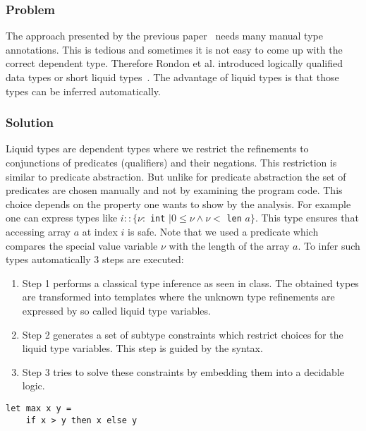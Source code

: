 \documentclass[a4paper,UKenglish]{lipics-v2016}
\begin{document}
\subsubsection{Problem}

The approach presented by the previous paper~\cite{Xi:1998:EAB} needs many manual type annotations.
This is tedious and sometimes it is not easy to come up with the correct dependent type.
Therefore Rondon et al. introduced logically qualified data types or short liquid types~\cite{Rondon:2008:LT}.
The advantage of liquid types is that those types can be inferred automatically.

\subsubsection{Solution}

Liquid types are dependent types where we restrict the refinements to conjunctions of predicates (qualifiers) and their negations.
This restriction is similar to predicate abstraction.
But unlike for predicate abstraction the set of predicates are chosen manually and not by examining the program code.
This choice depends on the property one wants to show by the analysis.
For example one can express types like $i:: \{\nu:$ \lstinline{int} $\mid 0 \le \nu \land \nu <$ \lstinline{len} $a\}$.
This type ensures that accessing array $a$ at index $i$ is safe.
Note that we used a predicate which compares the special value variable $\nu$ with the length of the array $a$.
To infer such types automatically 3 steps are executed:\medskip
\begin{enumerate}
    \item Step 1 performs a classical type inference as seen in class.
        The obtained types are transformed into templates where the unknown type refinements are expressed by so called liquid type variables.
    \item Step 2 generates a set of subtype constraints which restrict choices for the liquid type variables.
        This step is guided by the syntax.
    \item Step 3 tries to solve these constraints by embedding them into a decidable logic.
\end{enumerate}

\begin{lstlisting}[caption={Example Program},label=lst:exmpl,captionpos=t,float,abovecaptionskip=-\medskipamount]
let max x y =
    if x > y then x else y
\end{lstlisting}
\end{document}
